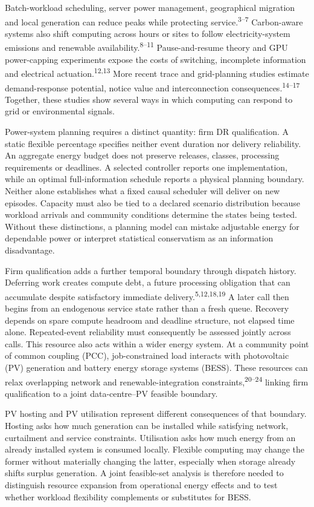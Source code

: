 \documentclass[10pt,a4paper]{article}
\begin{document}
Batch-workload scheduling, server power management, geographical migration and local generation can reduce peaks while protecting service.\textsuperscript{3–7} Carbon-aware systems also shift computing across hours or sites to follow electricity-system emissions and renewable availability.\textsuperscript{8–11} Pause-and-resume theory and GPU power-capping experiments expose the costs of switching, incomplete information and electrical actuation.\textsuperscript{12,13} More recent trace and grid-planning studies estimate demand-response potential, notice value and interconnection consequences.\textsuperscript{14–17} Together, these studies show several ways in which computing can respond to grid or environmental signals.


Power-system planning requires a distinct quantity: firm DR qualification. A static flexible percentage specifies neither event duration nor delivery reliability. An aggregate energy budget does not preserve releases, classes, processing requirements or deadlines. A selected controller reports one implementation, while an optimal full-information schedule reports a physical planning boundary. Neither alone establishes what a fixed causal scheduler will deliver on new episodes. Capacity must also be tied to a declared scenario distribution because workload arrivals and community conditions determine the states being tested. Without these distinctions, a planning model can mistake adjustable energy for dependable power or interpret statistical conservatism as an information disadvantage.


Firm qualification adds a further temporal boundary through dispatch history. Deferring work creates compute debt, a future processing obligation that can accumulate despite satisfactory immediate delivery.\textsuperscript{5,12,18,19} A later call then begins from an endogenous service state rather than a fresh queue. Recovery depends on spare compute headroom and deadline structure, not elapsed time alone. Repeated-event reliability must consequently be assessed jointly across calls. This resource also acts within a wider energy system. At a community point of common coupling (PCC), job-constrained load interacts with photovoltaic (PV) generation and battery energy storage systems (BESS). These resources can relax overlapping network and renewable-integration constraints,\textsuperscript{20–24} linking firm qualification to a joint data-centre–PV feasible boundary.


PV hosting and PV utilisation represent different consequences of that boundary. Hosting asks how much generation can be installed while satisfying network, curtailment and service constraints. Utilisation asks how much energy from an already installed system is consumed locally. Flexible computing may change the former without materially changing the latter, especially when storage already shifts surplus generation. A joint feasible-set analysis is therefore needed to distinguish resource expansion from operational energy effects and to test whether workload flexibility complements or substitutes for BESS.
\end{document}
